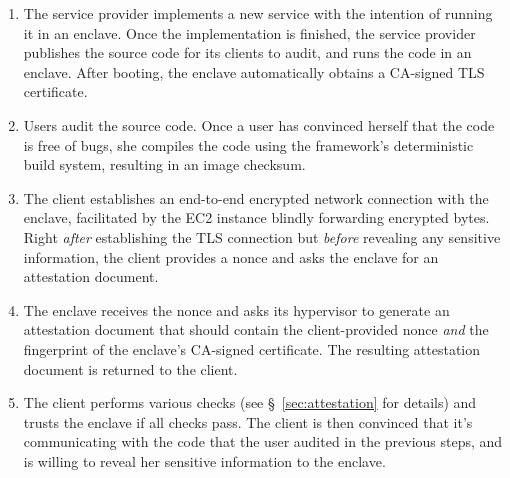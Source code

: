 \begin{enumerate}
    \item The service provider implements a new service with the intention of
      running it in an enclave.  Once the implementation is finished, the
      service provider publishes the source code for its clients to audit, and
      runs the code in an enclave.  After booting, the enclave automatically
      obtains a CA-signed TLS certificate.

    \item Users audit the source code.  Once a user has convinced herself that
      the code is free of bugs, she compiles the code using the framework's
      deterministic build system, resulting in an image checksum.

    \item The client establishes an end-to-end encrypted network connection with
      the enclave, facilitated by the EC2 instance blindly forwarding encrypted
      bytes.  Right \emph{after} establishing the TLS connection but
      \emph{before} revealing any sensitive information, the client provides a
      nonce and asks the enclave for an attestation document.

    \item The enclave receives the nonce and asks its hypervisor to generate an
      attestation document that should contain the client-provided nonce
      \emph{and} the fingerprint of the enclave's CA-signed certificate.  The
      resulting attestation document is returned to the client.

    \item The client performs various checks (see \S~\ref{sec:attestation} for
      details) and trusts the enclave if all checks pass.  The client is then
      convinced that it's communicating with the code that the user audited in
      the previous steps, and is willing to reveal her sensitive information to
      the enclave.
\end{enumerate}



